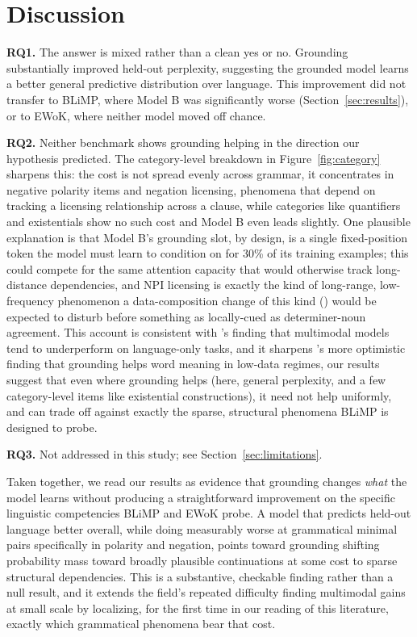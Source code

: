 \documentclass[11pt]{article}
\begin{document}
\section{Discussion}
\label{sec:discussion}
\textbf{RQ1.} The answer is mixed rather than a clean yes or no. Grounding substantially improved held-out perplexity, suggesting the grounded model learns a better general predictive distribution over language. This improvement did not transfer to BLiMP, where Model B was significantly worse (Section~\ref{sec:results}), or to EWoK, where neither model moved off chance.

\textbf{RQ2.} Neither benchmark shows grounding helping in the direction our hypothesis predicted. The category-level breakdown in Figure~\ref{fig:category} sharpens this: the cost is not spread evenly across grammar, it concentrates in negative polarity items and negation licensing, phenomena that depend on tracking a licensing relationship across a clause, while categories like quantifiers and existentials show no such cost and Model B even leads slightly. One plausible explanation is that Model B's grounding slot, by design, is a single fixed-position token the model must learn to condition on for 30\% of its training examples; this could compete for the same attention capacity that would otherwise track long-distance dependencies, and NPI licensing is exactly the kind of long-range, low-frequency phenomenon a data-composition change of this kind (\citealp{tabbaa2024whatshould}) would be expected to disturb before something as locally-cued as determiner-noun agreement. This account is consistent with \citet{amariucai2025modelmerging}'s finding that multimodal models tend to underperform on language-only tasks, and it sharpens \citet{zhuang2024multimodal}'s more optimistic finding that grounding helps word meaning in low-data regimes, our results suggest that even where grounding helps (here, general perplexity, and a few category-level items like existential constructions), it need not help uniformly, and can trade off against exactly the sparse, structural phenomena BLiMP is designed to probe.

\textbf{RQ3.} Not addressed in this study; see Section~\ref{sec:limitations}.

Taken together, we read our results as evidence that grounding changes \emph{what} the model learns without producing a straightforward improvement on the specific linguistic competencies BLiMP and EWoK probe. A model that predicts held-out language better overall, while doing measurably worse at grammatical minimal pairs specifically in polarity and negation, points toward grounding shifting probability mass toward broadly plausible continuations at some cost to sparse structural dependencies. This is a substantive, checkable finding rather than a null result, and it extends the field's repeated difficulty finding multimodal gains at small scale by localizing, for the first time in our reading of this literature, exactly which grammatical phenomena bear that cost.
\end{document}
